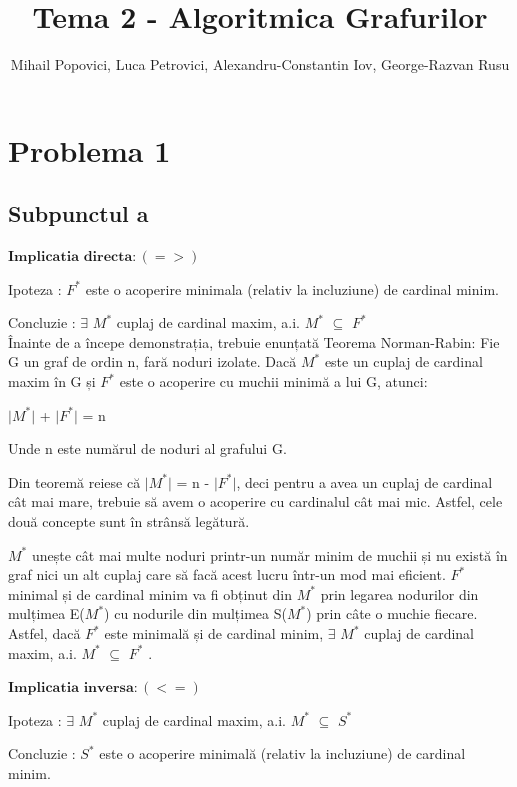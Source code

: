 \documentclass{article}
\title{Tema 2 - Algoritmica Grafurilor}
\author{Mihail Popovici, Luca Petrovici, Alexandru-Constantin Iov, George-Razvan Rusu}
\begin{document}
\maketitle

\section*{\fontsize{20}{50}\selectfont Problema 1}
\subsection*{\fontsize{16}{30}\selectfont Subpunctul a}
{\fontsize{14}{16}\selectfont 
$\mathbf{Implicatia}$ $\mathbf{directa: (=>)}$ 
\\
\par Ipoteza : $F^*$ este o acoperire minimala (relativ la incluziune) de cardinal minim.
\par Concluzie : $\exists$ $M^*$ cuplaj de cardinal maxim, a.i. $M^*$ $\subseteq$ $F^*$ 
\\

Înainte de a începe demonstrația, trebuie enunțată Teorema Norman-Rabin: Fie G un graf de ordin n, fară noduri izolate. Dacă $M^*$ este un cuplaj de cardinal maxim în G și $F^*$ este o acoperire cu muchii minimă a lui G, atunci:
\par \centerline{$\vert$$M^*$$\vert$ + $\vert$$F^*$$\vert$ = n}
Unde n este numărul de noduri al grafului G.

Din teoremă reiese că $\vert$$M^*$$\vert$ = n - $\vert$$F^*$$\vert$, deci pentru a avea un cuplaj de cardinal cât mai mare, trebuie să avem o acoperire cu cardinalul cât mai mic. Astfel, cele două concepte sunt în strânsă legătură.


\par $M^*$ unește cât mai multe noduri printr-un număr minim de muchii și nu există în graf nici un alt cuplaj care să facă acest lucru într-un mod mai eficient. $F^*$ minimal și de cardinal minim va fi obținut din $M^*$ prin legarea nodurilor din mulțimea E($M^*$) cu nodurile din mulțimea S($M^*$) prin câte o muchie fiecare. Astfel, dacă $F^*$ este minimală și de cardinal minim, $\exists$ $M^*$ cuplaj de cardinal maxim, a.i. $M^*$ $\subseteq$ $F^*$ . 
\par
$\mathbf{Implicatia}$ $\mathbf{inversa: (<=)}$ 
\\
\par Ipoteza : $\exists$ $M^*$ cuplaj de cardinal maxim, a.i. $M^*$ $\subseteq$ $S^*$ 
\par Concluzie : $S^*$ este o acoperire minimală (relativ la incluziune) de cardinal minim.      
\\

}
\end{document}
